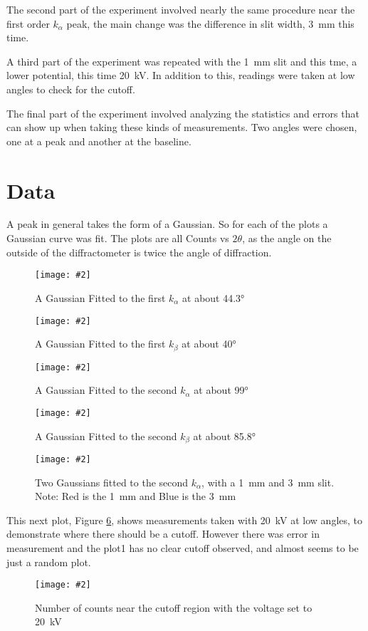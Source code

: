 \documentclass[letterpaper,12pt]{article}
\newcommand{\labfig}[4]{
  \begin{figure}[H]
    \centering
    \texttt{[image: \#2]}
    \caption{#3}
    \label{#4}
  \end{figure}}
\begin{document}
The second part of the experiment involved nearly the same procedure near the first order $k_\alpha$ peak, the main change was the difference in slit width, \SI{3}{\milli\meter} this time.

A third part of the experiment was repeated with the \SI{1}{\milli\meter} slit and this tme, a lower potential, this time \SI{20}{\kV}. In addition to this, readings were taken at low angles to check for the cutoff.

The final part of the experiment involved analyzing the statistics and errors that can show up when taking these kinds of measurements. Two angles were chosen, one at a peak and another at the baseline. 
\section{Data}
A peak in general takes the form of a Gaussian. So for each of the plots a Gaussian curve was fit. The plots are all Counts vs $2\theta$, as the angle on the outside of the diffractometer is twice the angle of diffraction.
\labfig{14}{./img/ka1}{A Gaussian Fitted to the first $k_\alpha$ at about \ang{44.3}}{ka1}
\labfig{14}{./img/kb1}{A Gaussian Fitted to the first $k_\beta$ at about \ang{40}}{kb1}
\labfig{14}{./img/ka2}{A Gaussian Fitted to the second $k_\alpha$ at about \ang{99}}{ka2}
\labfig{14}{./img/kb2}{A Gaussian Fitted to the second $k_\beta$ at about \ang{85.8}}{kb2}
\labfig{14}{./img/1v3}{Two Gaussians fitted to the second $k_\alpha$, with a \SI{1}{\milli\meter} and \SI{3}{\milli\meter} slit. Note: Red is the \SI{1}{\milli\meter} and Blue is the \SI{3}{\milli\meter}}{1v3}
This next plot, Figure \ref{20kev}, shows measurements taken with \SI{20}{\kV} at low angles, to demonstrate where there should be a cutoff. However there was error in measurement and the plot1 has no clear cutoff observed, and almost seems to be just a random plot. 
\labfig{14}{./img/20kev}{Number of counts near the cutoff region with the voltage set to \SI{20}{\kV}}{20kev}
\end{document}
